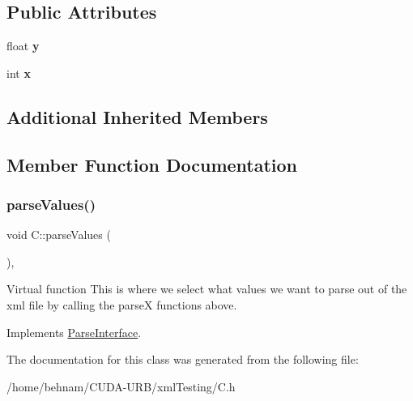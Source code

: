 \subsection*{Public Attributes}
\begin{DoxyCompactItemize}
\item 
\mbox{\label{classC_acd8eedda62e4ea6c74b7e0b59245a357}} 
float {\bfseries y}
\item 
\mbox{\label{classC_a644bc4405a602578b65e83d317a2f3eb}} 
int {\bfseries x}
\end{DoxyCompactItemize}
\subsection*{Additional Inherited Members}


\subsection{Member Function Documentation}
\mbox{\label{classC_a7f8b8fa8187ab2f50ca999ae9a1687d7}} 
\subsubsection{\texorpdfstring{parse\+Values()}{parseValues()}}
{\footnotesize\ttfamily void C\+::parse\+Values (\begin{DoxyParamCaption}{ }\end{DoxyParamCaption})\hspace{0.3cm}{\ttfamily [inline]}, {\ttfamily [virtual]}}

Virtual function This is where we select what values we want to parse out of the xml file by calling the parseX functions above. 

Implements \hyperlink{classParseInterface_afca32108192ba0997c9e5a78189b0cbc}{Parse\+Interface}.



The documentation for this class was generated from the following file\+:\begin{DoxyCompactItemize}
\item 
/home/behnam/\+C\+U\+D\+A-\/\+U\+R\+B/xml\+Testing/C.\+h\end{DoxyCompactItemize}
